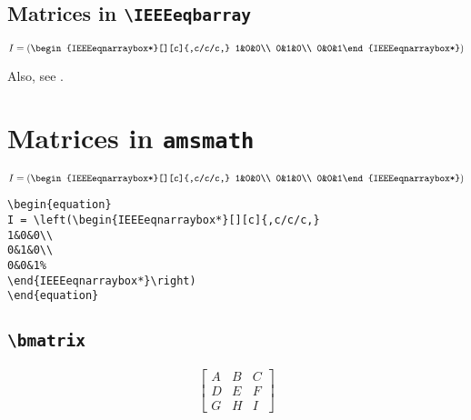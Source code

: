 \documentclass[journal]{IEEEtran}
\begin{document}
\subsection{Matrices in \texttt{\textbackslash IEEEeqbarray}}
\label{ch:mat-in-ieeeeqarray}

\begin{equation}
I = \left(\begin{IEEEeqnarraybox*}[][c]{,c/c/c,}
1&0&0\\
0&1&0\\
0&0&1%
\end{IEEEeqnarraybox*}\right)
\end{equation}

Also, see .
\newpage
\par \noindent \dotfill
\section{Matrices in \texttt{amsmath}} \label{ch:mat-in-amsmath}
\begin{equation}
I = \left(\begin{IEEEeqnarraybox*}[][c]{,c/c/c,}
1&0&0\\
0&1&0\\
0&0&1%
\end{IEEEeqnarraybox*}\right)
\end{equation}

\begin{verbatim}
\begin{equation}
I = \left(\begin{IEEEeqnarraybox*}[][c]{,c/c/c,}
1&0&0\\
0&1&0\\
0&0&1%
\end{IEEEeqnarraybox*}\right)
\end{equation}
\end{verbatim}



\subsection{\texttt{\textbackslash bmatrix}}
\[\begin{bmatrix} 
A & B & C \\ 
D & E & F \\ 
G & H & I 
\end{bmatrix}\]
\end{document}
